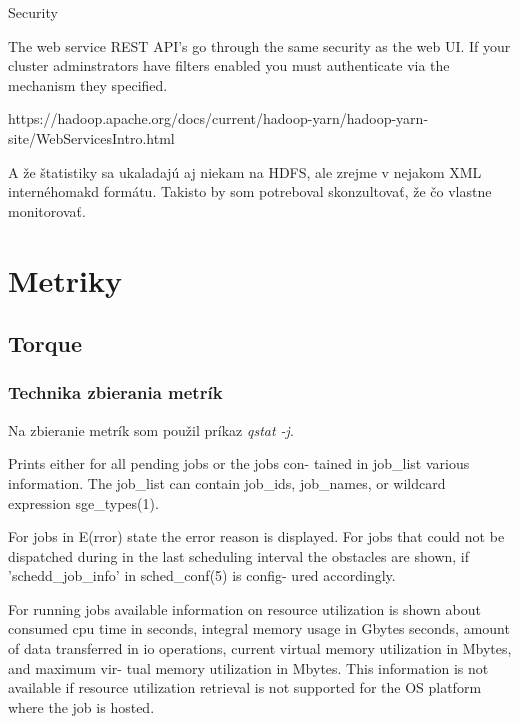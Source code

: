 \documentclass[11pt,final,oneside]{fithesis}
\begin{document}
Security

The web service REST API’s go through the same security as the web UI. If your cluster adminstrators have filters enabled you must authenticate via the mechanism they specified.

https://hadoop.apache.org/docs/current/hadoop-yarn/hadoop-yarn-site/WebServicesIntro.html

A že štatistiky sa ukaladajú aj niekam na HDFS, ale zrejme v nejakom XML internéhomakd
formátu. Takisto by som potreboval skonzultovať, že čo vlastne monitorovať.

\chapter{Metriky}
\section{Torque}
\subsection{Technika zbierania metrík}
Na zbieranie metrík som použil príkaz \emph{qstat -j}.

			Prints either for all pending jobs  or  the  jobs  con-
          tained  in  job_list  various information. The job_list
          can contain job_ids, job_names, or wildcard  expression
          sge_types(1).

          For  jobs  in  E(rror)  state  the  error   reason   is
          displayed. For jobs that could not be dispatched during
          in the  last  scheduling  interval  the  obstacles  are
          shown, if 'schedd_job_info' in sched_conf(5) is config-
          ured accordingly.

          For running  jobs  available  information  on  resource
          utilization   is  shown  about  consumed  cpu  time  in
          seconds,  integral  memory  usage  in  Gbytes  seconds,
          amount  of  data  transferred in io operations, current
          virtual memory utilization in Mbytes, and maximum  vir-
          tual  memory utilization in Mbytes. This information is
          not available if resource utilization retrieval is  not
          supported for the OS platform where the job is hosted.
\end{document}
